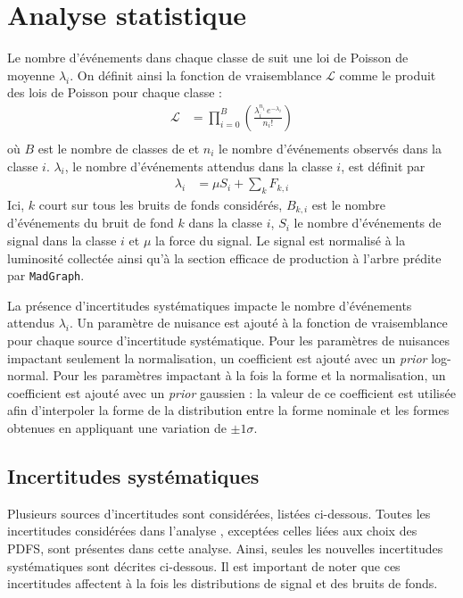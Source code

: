 \section{Analyse statistique} \label{sec:higgs_stat}

Le nombre d'événements dans chaque classe de \mtt suit une loi de Poisson de moyenne $\lambda_i$. On définit ainsi la fonction de vraisemblance $\mathcal{L}$ comme le produit des lois de Poisson pour chaque classe :
\begin{align*}
  \mathcal{L} &= \prod\limits_{i = 0}^B \left( \frac{\lambda_i^{n_i} \, e^{- \lambda_i}}{n_i!} \right) \\
\end{align*}
où $B$ est le nombre de classes de \mtt et $n_i$ le nombre d'événements observés dans la classe $i$. $\lambda_i$, le nombre d'événements attendus dans la classe $i$, est définit par
\begin{align*}
  \lambda_i &= \mu S_i + \sum \limits_k F_{k, i}
\end{align*}
Ici, $k$ court sur tous les bruits de fonds considérés, $B_{k, i}$ est le nombre d'événements du bruit de fond $k$ dans la classe $i$, $S_i$ le nombre d'événements de signal dans la classe $i$ et $\mu$ la force du signal. Le signal est normalisé à la luminosité collectée ainsi qu'à la section efficace de production à l'arbre prédite par \texttt{MadGraph}.

La présence d'incertitudes systématiques impacte le nombre d'événements attendus $\lambda_i$. Un paramètre de nuisance est ajouté à la fonction de vraisemblance pour chaque source d'incertitude systématique. Pour les paramètres de nuisances impactant seulement la normalisation, un coefficient est ajouté avec un \emph{prior} log-normal. Pour les paramètres impactant à la fois la forme et la normalisation, un coefficient est ajouté avec un \emph{prior} gaussien : la valeur de ce coefficient est utilisée afin d'interpoler la forme de la distribution entre la forme nominale et les formes obtenues en appliquant une variation de $\pm 1 \sigma$.

\subsection{Incertitudes systématiques} \label{sec:higgs_syst}

Plusieurs sources d'incertitudes sont considérées, listées ci-dessous. Toutes les incertitudes considérées dans l'analyse \zprime, exceptées celles liées aux choix des PDFS, sont présentes dans cette analyse. Ainsi, seules les nouvelles incertitudes systématiques sont décrites ci-dessous. Il est important de noter que ces incertitudes affectent à la fois les distributions de signal et des bruits de fonds.


